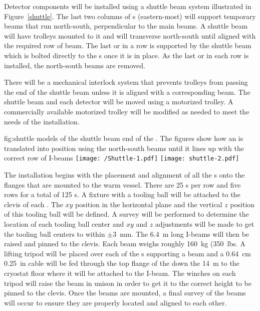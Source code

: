 Detector components will be installed using a shuttle beam system
illustrated in Figure~\ref{shuttle}.  The last two columns of
\fdth{}s (eastern-most) will support temporary beams that run
north-south, perpendicular to the main  beams.  A shuttle
beam
will have trolleys mounted to it and will transverse
north-south until aligned with the required row of  beam.  The last
 or  in a row is supported by the shuttle beam which is bolted
directly to the \fdth{}s once it is in place.  As the last  or
 in each row is installed, the north-south beams are removed.

There will be a mechanical interlock system that prevents trolleys
from passing the end of the shuttle beam unless it is aligned with a
corresponding  beam.  The shuttle beam and each detector  will be
moved using a motorized trolley.  A commercially available motorized
trolley will be modified as needed to meet the needs of the
installation.

\begin{dunefigure}{fig:shuttle}
  {\threed models of the shuttle beam end of the . The figures show how an 
is translated into position using the north-south beams until it lines up with the correct
row of I-beams}
\texttt{[image: /Shuttle-1.pdf]}
 \texttt{[image: shuttle-2.pdf]}
\end{dunefigure}


The  installation begins with the placement and alignment of all
the \fdth{}s onto the flanges that are mounted to the warm vessel.
There are \num{25} \fdth{}s per row and five rows for a total of \num{125}
\fdth{}s.  A fixture with a tooling ball will be attached to the
clevis of each \fdth.  The $xy$ position in the horizontal plane
and the vertical $z$ position of this tooling ball will be defined.  A
survey will be performed to determine the location of each tooling
ball center and $xy$ and $z$ adjustments will be made to get the tooling
ball centers to within $\pm$\SI{3}{mm}.  The \SI{6.4}{m} long I-beams will then be
raised and pinned to the clevis.  Each beam weighs roughly \SI{160}{kg} (\SI{350}{lbs}.
A lifting tripod will be placed over each of the \fdth{}s
supporting a beam and a \SI{0.64}{cm} \SI{0.25}{in}  %
cable will be fed through the top
flange of the \fdth down the \SI{14}{m} to the cryostat floor where it
will be attached to the I-beam.  The winches on each tripod will raise
the beam in unison in order to get it to the correct height to be
pinned to the \fdth clevis.  Once the beams are mounted, a final
survey of the beams will occur to ensure they are properly located and aligned
to each other.

